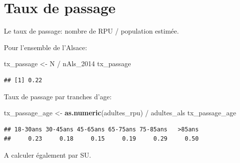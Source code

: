 \documentclass[]{article}
\newenvironment{Shaded}{\begin{snugshade}}{\end{snugshade}}
\newcommand{\KeywordTok}[1]{\textcolor[rgb]{0.13,0.29,0.53}{\textbf{{#1}}}}
\newcommand{\StringTok}[1]{\textcolor[rgb]{0.31,0.60,0.02}{{#1}}}
\newcommand{\NormalTok}[1]{{#1}}
\begin{document}
\section{Taux de passage}\label{taux-de-passage}

Le taux de passage: nombre de RPU / population estimée.

Pour l'ensemble de l'Alsace:

\begin{Shaded}
\begin{Highlighting}[]
\NormalTok{tx_passage <-}\StringTok{ }\NormalTok{N /}\StringTok{ }\NormalTok{nAls_2014}
\NormalTok{tx_passage}
\end{Highlighting}
\end{Shaded}

\begin{verbatim}
## [1] 0.22
\end{verbatim}

Taux de passage par tranches d'age:

\begin{Shaded}
\begin{Highlighting}[]
\NormalTok{tx_passage_age <-}\StringTok{ }\KeywordTok{as.numeric}\NormalTok{(adultes_rpu) /}\StringTok{ }\NormalTok{adultes_als}
\NormalTok{tx_passage_age}
\end{Highlighting}
\end{Shaded}

\begin{verbatim}
## 18-30ans 30-45ans 45-65ans 65-75ans 75-85ans   >85ans 
##     0.23     0.18     0.15     0.19     0.29     0.50
\end{verbatim}

A calculer également par SU.
\end{document}
